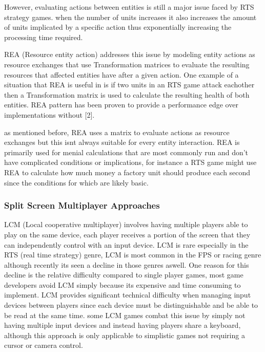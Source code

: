 \documentclass[]{final_report}
\begin{document}
However, evaluating actions between entities is still a major issue faced by RTS strategy games. when the number of units increases it also increases the amount of units implicated by a specific action thus exponentially increasing the processing time required.  \newline

 REA (Resource entity action) addresses this issue by modeling entity actions as resource exchanges that use Transformation matrices to evaluate the resulting resources that affected entities have after a given action. One example of a situation that REA is useful in is if two units in an RTS game attack eachother then a Transformation matrix is used to calculate the resulting health of both entities. REA pattern has been proven to provide a performance edge over implementations without [2]. \newline
 
 as mentioned before, REA uses a matrix to evaluate actions as resource exchanges but this isnt always suitable for every entity interaction. REA is primarily used for menial calculations that are most commonly run and don't have complicated conditions or implications, for instance a RTS game might use REA to calculate how much money a factory unit should produce each second since the conditions for whicb are likely basic. \newline
 
 

\subsubsection{Split Screen Multiplayer Approaches }

LCM (Local cooperative multiplayer) involves having multiple players able to play on the same device, each player receives a portion of the screen that they can independently control with an input device. LCM is rare especially in the RTS (real time strategy) genre, LCM is most common in the FPS or racing genre although recently its seen a decline in those genres aswell. One reason for this decline is the relative difficulty compared to single player games, most game developers avoid LCM simply because its expensive and time consuming to implement. \newline
LCM provides significant technical difficulty when managing input devices between players since each device must be distinguishable and be able to be read at the same time. some LCM games combat this issue by simply not having multiple input devices and instead having players share a keyboard, although this approach is only applicable to simplistic games not requiring a cursor or camera control. \newline
\end{document}
